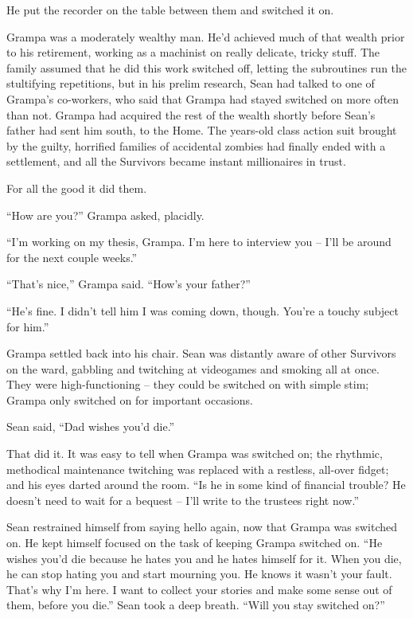He put the recorder on the table between them and switched it on.

\tb

Grampa was a moderately wealthy man. He'd achieved much of that wealth 
prior to his retirement, working as a machinist on really delicate, 
tricky stuff. The family assumed that he did this work switched off, 
letting the subroutines run the stultifying repetitions, but in his 
prelim research, Sean had talked to one of Grampa's co-workers, who 
said that Grampa had stayed switched on more often than not. Grampa had 
acquired the rest of the wealth shortly before Sean's father had sent 
him south, to the Home. The years-old class action suit brought by the 
guilty, horrified families of accidental zombies had finally ended with 
a settlement, and all the Survivors became instant millionaires in 
trust.

For all the good it did them.

“How are you?” Grampa asked, placidly.

“I'm working on my thesis, Grampa. I'm here to interview you -- I'll 
be around for the next couple weeks.”

“That's nice,” Grampa said. “How's your father?”

“He's fine. I didn't tell him I was coming down, though. You're a 
touchy subject for him.”

Grampa settled back into his chair. Sean was distantly aware of other 
Survivors on the ward, gabbling and twitching at videogames and smoking 
all at once. They were high-functioning -- they could be switched on 
with simple stim; Grampa only switched on for important occasions.

Sean said, “Dad wishes you'd die.”

That did it. It was easy to tell when Grampa was switched on; the 
rhythmic, methodical maintenance twitching was replaced with a 
restless, all-over fidget; and his eyes darted around the room. “Is 
he in some kind of financial trouble? He doesn't need to wait for a 
bequest -- I'll write to the trustees right now.”

Sean restrained himself from saying hello again, now that Grampa was 
switched on. He kept himself focused on the task of keeping Grampa 
switched on. “He wishes you'd die because he hates you and he hates 
himself for it. When you die, he can stop hating you and start mourning 
you. He knows it wasn't your fault. That's why I'm here. I want to 
collect your stories and make some sense out of them, before you 
die.” Sean took a deep breath. “Will you stay switched on?”

